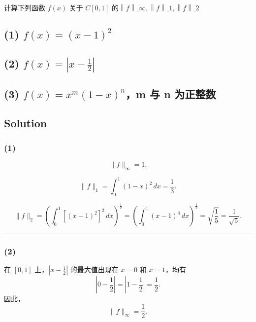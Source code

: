 \documentclass[11pt]{article}
\begin{document}
计算下列函数 \(f(x)\) 关于 \(C[0, 1]\)
的\(\left\lVert f\right\rVert\_\infty,\left\lVert f\right\rVert\_1,\left\lVert f\right\rVert\_2
\)

\subsection{\texorpdfstring{(1)
\(f(x) = (x - 1) ^ 2\)}{(1) f(x) = (x - 1) \^{} 2}}\label{fx-x---1-2}

\subsection{\texorpdfstring{(2)
\(f(x) = \left| x - \frac{1}{2} \right|\)}{(2) f(x) = \textbackslash left\textbar{} x - \textbackslash frac\{1\}\{2\} \textbackslash right\textbar{}}}\label{fx-left-x---frac12-right}

\subsection{\texorpdfstring{(3) \(f(x) = x^m(1 - x)^n\)，m 与 n
为正整数}{(3) f(x) = x\^{}m(1 - x)\^{}n，m 与 n 为正整数}}\label{fx-xm1---xnm-ux4e0e-n-ux4e3aux6b63ux6574ux6570}

    \subsection{Solution}\label{solution}

\subsubsection{(1)}\label{section}

\[
\|f\|_{\infty} = 1.
\]

\[
\|f\|_{1} = \int_0^1 (1-x)^2\,dx=\frac{1}{3}.
\]

\[
\|f\|_{2} = \left(\int_0^1 \left[(x-1)^2\right]^2\,dx\right)^{\frac{1}{2}} = \left(\int_0^1 (x-1)^4\,dx\right)^{\frac{1}{2}} = \sqrt{\frac{1}{5}} = \frac{1}{\sqrt{5}}.
\]

\begin{center}\rule{0.5\linewidth}{0.5pt}\end{center}

\subsubsection{(2)}\label{section-1}

在 \([0,1]\) 上，\(\left|x-\frac{1}{2}\right|\) 的最大值出现在 \(x=0\)
和 \(x=1\)，均有 \[
\left|0-\frac{1}{2}\right| = \left|1-\frac{1}{2}\right| = \frac{1}{2}.
\] 因此， \[
\|f\|_{\infty} = \frac{1}{2}.
\]
\end{document}
